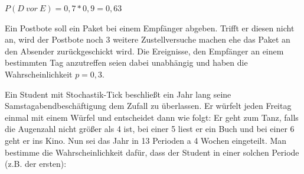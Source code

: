\documentclass[10pt, a4paper]{exam}
\begin{document}
\begin{questions}
\begin{solution}
        $P(D\ vor\ E)= 0,7*0,9=0,63$
    \end{solution}

    \question Ein Postbote soll ein Paket bei einem Empfänger abgeben. Trifft er diesen nicht an, wird der Postbote noch 3 weitere Zustellversuche machen ehe das Paket an den Absender zurückgeschickt wird. Die Ereignisse, den Empfänger an einem bestimmten Tag anzutreffen seien dabei unabhängig und haben die Wahrscheinlichkeit $p=0,3$.

    \question Ein Student mit Stochastik-Tick beschließt ein Jahr lang seine Samstagabendbeschäftigung dem Zufall zu überlassen. Er würfelt jeden Freitag einmal mit einem Würfel und entscheidet dann wie folgt: Er geht zum Tanz, falls die Augenzahl nicht größer als 4 ist, bei einer 5 liest er ein Buch und bei einer 6 geht er ins Kino. Nun sei das Jahr in 13 Perioden a 4 Wochen eingeteilt. Man bestimme die Wahrscheinlichkeit dafür, dass der Student in einer solchen Periode (z.B. der ersten):
\end{questions}
\end{document}
